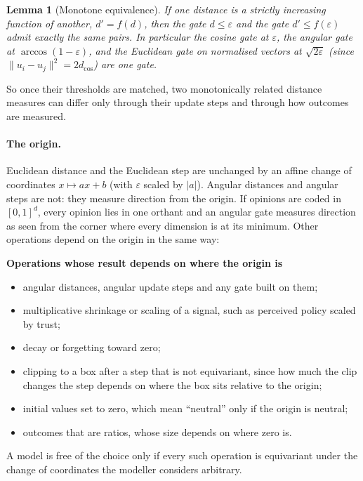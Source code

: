 \documentclass[11pt]{article}
\newtheorem{lemma}{Lemma}
\begin{document}
\begin{lemma}[Monotone equivalence]
\label{lem:monotone}
If one distance is a strictly increasing function of another, $d' = f(d)$, then the gate $d \le \varepsilon$ and the gate $d' \le f(\varepsilon)$ admit exactly the same pairs.
In particular the cosine gate at $\varepsilon$, the angular gate at $\arccos(1-\varepsilon)$, and the Euclidean gate on normalised vectors at $\sqrt{2\varepsilon}$ (since $\lVert u_i - u_j\rVert^2 = 2 d_{\cos}$) are one gate.
\end{lemma}
\noindent So once their thresholds are matched, two monotonically related distance measures can differ only through their update steps and through how outcomes are measured.

\paragraph{The origin.}
Euclidean distance and the Euclidean step are unchanged by an affine change of coordinates $x \mapsto a x + b$ (with $\varepsilon$ scaled by $|a|$).
Angular distances and angular steps are not: they measure direction from the origin.
If opinions are coded in $[0,1]^d$, every opinion lies in one orthant and an angular gate measures direction as seen from the corner where every dimension is at its minimum.
Other operations depend on the origin in the same way:
\begin{framed}
\noindent\textbf{Operations whose result depends on where the origin is}
\begin{itemize}
\item angular distances, angular update steps and any gate built on them;
\item multiplicative shrinkage or scaling of a signal, such as perceived policy scaled by trust;
\item decay or forgetting toward zero;
\item clipping to a box after a step that is not equivariant, since how much the clip changes the step depends on where the box sits relative to the origin;
\item initial values set to zero, which mean ``neutral'' only if the origin is neutral;
\item outcomes that are ratios, whose size depends on where zero is.
\end{itemize}
\end{framed}
\noindent A model is free of the choice only if every such operation is equivariant under the change of coordinates the modeller considers arbitrary.
\end{document}
